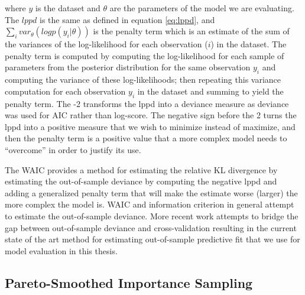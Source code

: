 where $y$ is the dataset and $\theta$ are the parameters of the model we are evaluating. The $lppd$ is the same as defined in equation \ref{eq:lppd}, and $\sum_i var_{\theta}(logp(y_i|\theta))$ is the penalty term which is an estimate of the sum of the variances of the log-likelihood for each observation ($i$) in the dataset. The penalty term is computed by computing the log-likelihood for each sample of parameters from the posterior distribution for the same observation $y_i$ and computing the variance of these log-likelihoods; then repeating this variance computation for each observation $y_i$ in the dataset and summing to yield the penalty term. The -2 transforms the lppd into a deviance measure as deviance was used for AIC rather than log-score. The negative sign before the 2 turns the lppd into a positive measure that we wish to minimize instead of maximize, and then the penalty term is a positive value that a more complex model needs to ``overcome'' in order to justify its use.

The WAIC provides a method for estimating the relative KL divergence by estimating the out-of-sample deviance by computing the negative lppd and adding a generalized penalty term that will make the estimate worse (larger) the more complex the model is. WAIC and information criterion in general attempt to estimate the out-of-sample deviance. More recent work attempts to bridge the gap between out-of-sample deviance and cross-validation resulting in the current state of the art method for estimating out-of-sample predictive fit that we use for model evaluation in this thesis.

\subsection*{Pareto-Smoothed Importance Sampling}

